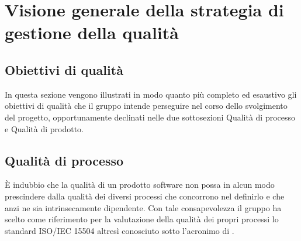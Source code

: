 \section{Visione generale della strategia di gestione della qualità}
	\subsection{Obiettivi di qualità}
	In questa sezione vengono illustrati in modo quanto più completo ed esaustivo gli obiettivi di qualità che il gruppo intende perseguire nel corso 	dello svolgimento del progetto, opportunamente declinati nelle due sottosezioni Qualità di processo e Qualità di prodotto.

	\subsection{Qualità di processo}
	È indubbio che la qualità di un prodotto software non possa in alcun modo prescindere dalla qualità dei diversi processi che concorrono nel definirlo e 	che anzi ne sia intrinsecamente dipendente. Con tale consapevolezza il gruppo ha scelto come riferimento per la valutazione della qualità dei propri 		processi lo standard ISO/IEC 15504 altresì conosciuto sotto l'acronimo di .
